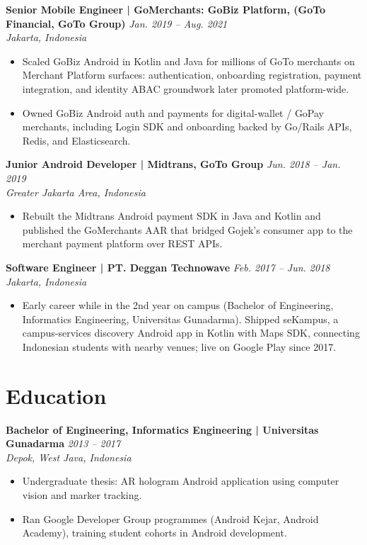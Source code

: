 \documentclass[10pt]{article}
\begin{document}
{\vspace{4pt}
\textbf{Senior Mobile Engineer | GoMerchants: GoBiz Platform, (GoTo Financial, GoTo Group)} \hfill \textit{Jan. 2019 -- Aug. 2021}\\
\textit{Jakarta, Indonesia}
\begin{itemize}
\item Scaled GoBiz Android in Kotlin and Java for millions of GoTo merchants on Merchant Platform surfaces: authentication, onboarding registration, payment integration, and identity ABAC groundwork later promoted platform-wide.
\item Owned GoBiz Android auth and payments for digital-wallet / GoPay merchants, including Login SDK and onboarding backed by Go/Rails APIs, Redis, and Elasticsearch.
\end{itemize}

\vspace{4pt}
\textbf{Junior Android Developer | Midtrans, GoTo Group} \hfill \textit{Jun. 2018 -- Jan. 2019}\\
\textit{Greater Jakarta Area, Indonesia}
\begin{itemize}
\item Rebuilt the Midtrans Android payment SDK in Java and Kotlin and published the GoMerchants AAR that bridged Gojek's consumer app to the merchant payment platform over REST APIs.
\end{itemize}

\vspace{4pt}
\textbf{Software Engineer | PT. Deggan Technowave} \hfill \textit{Feb. 2017 -- Jun. 2018}\\
\textit{Jakarta, Indonesia}
\begin{itemize}
\item Early career while in the 2nd year on campus (Bachelor of Engineering, Informatics Engineering, Universitas Gunadarma). Shipped seKampus, a campus-services discovery Android app in Kotlin with Maps SDK, connecting Indonesian students with nearby venues; live on Google Play since 2017.
\end{itemize}

\section*{Education}

\textbf{Bachelor of Engineering, Informatics Engineering | Universitas Gunadarma} \hfill \textit{2013 -- 2017}\\
\textit{Depok, West Java, Indonesia}
\begin{itemize}
\item Undergraduate thesis: AR hologram Android application using computer vision and marker tracking.
\item Ran Google Developer Group programmes (Android Kejar, Android Academy), training student cohorts in Android development.
\end{itemize}

}
\end{document}
